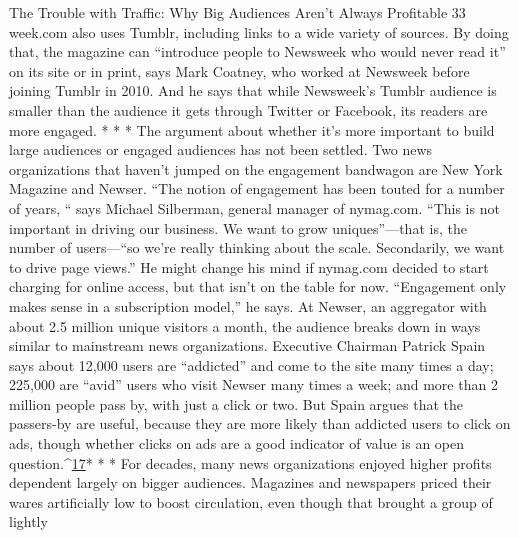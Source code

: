 The Trouble with Traffic: Why Big Audiences Aren’t Always Profitable 33
week.com also uses Tumblr, including links to a wide variety of sources. By doing
that, the magazine can ``introduce people to Newsweek who would never read
it'' on its site or in print, says Mark Coatney, who worked at Newsweek before
joining Tumblr in 2010. And he says that while Newsweek’s Tumblr audience
is smaller than the audience it gets through Twitter or Facebook, its readers are
more engaged.
* * *
The argument about whether it’s more important to build large audiences
or engaged audiences has not been settled. Two news organizations that haven’t
jumped on the engagement bandwagon are New York Magazine and Newser.
``The notion of engagement has been touted for a number of years, “ says Michael
Silberman, general manager of nymag.com. “This is not important in driving
our business. We want to grow uniques''—that is, the number of users—``so
we’re really thinking about the scale. Secondarily, we want to drive page views.''
He might change his mind if nymag.com decided to start charging for online
access, but that isn’t on the table for now. ``Engagement only makes sense in a
subscription model,'' he says.
At Newser, an aggregator with about 2.5 million unique visitors a month, the
audience breaks down in ways similar to mainstream news organizations. Executive
Chairman Patrick Spain says about 12,000 users are ``addicted'' and come
to the site many times a day; 225,000 are ``avid'' users who visit Newser many
times a week; and more than 2 million people pass by, with just a click or two.
But Spain argues that the passers-by are useful, because they are more likely than
addicted users to click on ads, though whether clicks on ads are a good indicator
of value is an open question.^{\href{#endnotes-ch2}{17}}* * *
For decades, many news organizations enjoyed higher profits dependent
largely on bigger audiences. Magazines and newspapers priced their wares artificially
low to boost circulation, even though that brought a group of lightly

